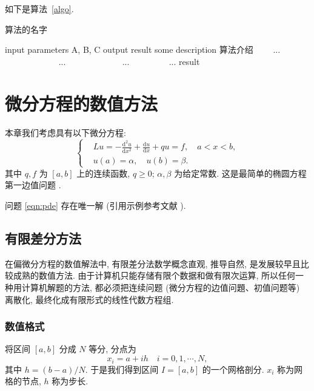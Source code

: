 \documentclass[UTF8,openany,twoside,12pt]{book}
\theoremstyle{plain}
\begin{document}
如下是算法~\ref{algo}.
\begin{algorithm}[!htbp]
\caption{算法的名字}\label{algo}  %
\begin{algorithmic}[1]
\Require  input parameters A, B, C  %
\Ensure  output result   %
\State some description 算法介绍   %
　　\State ...
　　　　\State ...
　　\Else
　　　　\State ...
　　\EndIf
\EndFor
{}  %
　　\State ...
\EndWhile
\State \Return result
\end{algorithmic}
\end{algorithm}




\chapter{微分方程的数值方法}

本章我们考虑具有以下微分方程:
\begin{equation}\label{eqn:pde}
\left\{\begin{aligned}
& L u=-\frac{\mathrm{d}^{2} u}{\mathrm{d} x^{2}}+\frac{\mathrm{d} u}{\mathrm{d} x}+q u=f, \quad a < x < b, \\
& u(a)=\alpha, \quad u(b)=\beta.
\end{aligned}\right.
\end{equation}
其中 $q, f$ 为 $[a,b]$ 上的连续函数, $q \geqslant 0$; $\alpha, \beta$ 为给定常数. 这是最简单的椭圆方程第一边值问题 .

问题 \eqref{eqn:pde} 存在唯一解 (引用示例参考文献 \cite{LiLiu1997}).


\section{有限差分方法}
在偏微分方程的数值解法中, 有限差分法数学概念直观, 推导自然, 是发展较早且比较成熟的数值方法. 由于计算机只能存储有限个数据和做有限次运算, 所以任何一种用计算机解题的方法, 都必须把连续问题 (微分方程的边值问題、初值问题等) 离散化, 最终化成有限形式的线性代数方程组.

\subsection{数值格式}
将区间 $[a,b]$ 分成 $N$ 等分, 分点为
\begin{equation*}
  x_{i}=a+i h \quad i=0,1, \cdots, N,
\end{equation*}
其中 $h=(b-a) / N$. 于是我们得到区间 $I=[a,b]$ 的一个网格剖分. $x_i$ 称为网格的节点, $h$ 称为步长.
\end{document}
